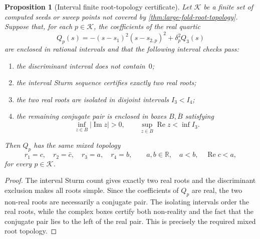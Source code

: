 \documentclass[11pt,a4paper]{article}
\theoremstyle{plain}
\newtheorem{proposition}[theorem]{Proposition}
\theoremstyle{definition}
\theoremstyle{remark}
\DeclareMathOperator{\Real}{Re}
\DeclareMathOperator{\Imag}{Im}
\newcommand{\RR}{\mathbb{R}}
\newcommand{\abs}[1]{\lvert #1 \rvert}
\begin{document}
\begin{proposition}[Interval finite root-topology certificate]
\label{prop:finite-root-topology-certificate}
Let $\mathcal K$ be a finite set of computed seeds or sweep points not
covered by \cref{thm:large-fold-root-topology}.  Suppose that, for
each $p\in\mathcal K$, the coefficients of the real quartic
\[
  Q_p(s)=-(s-s_1)^2(s-s_{2,p})^2+\delta_p^2Q_3(s)
\]
are enclosed in rational intervals and that the following interval
checks pass:
\begin{enumerate}
  \item the discriminant interval does not contain~$0$;
  \item the interval Sturm sequence certifies exactly two real roots;
  \item the two real roots are isolated in disjoint intervals
    $I_3<I_4$;
  \item the remaining conjugate pair is enclosed in boxes
    $B,\overline B$ satisfying
    \[
      \inf_{z\in B}\abs{\Imag z}>0,
      \qquad
      \sup_{z\in B}\Real z<\inf I_3.
    \]
\end{enumerate}
Then $Q_p$ has the same mixed topology
\[
  r_1=c,\quad r_2=\bar c,\quad r_3=a,\quad r_4=b,
  \qquad a,b\in\RR,\quad a<b,\quad \Real c<a,
\]
for every $p\in\mathcal K$.
\end{proposition}

\begin{proof}
The interval Sturm count gives exactly two real roots and the
discriminant exclusion makes all roots simple.  Since the coefficients
of $Q_p$ are real, the two non-real roots are necessarily a conjugate
pair.  The isolating intervals order the real roots, while the complex
boxes certify both non-reality and the fact that the conjugate pair
lies to the left of the real pair.  This is precisely the required
mixed root topology.
\end{proof}
\end{document}
